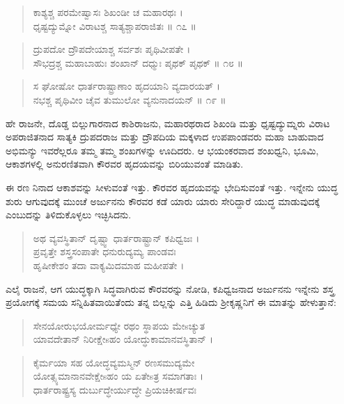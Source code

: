 \begin{verse}
ಕಾಶ್ಯಶ್ಚ ಪರಮೇಷ್ವಾಸಃ ಶಿಖಂಡೀ ಚ ಮಹಾರಥಃ ।\\ಧೃಷ್ಟದ್ಯುಮ್ನೋ ವಿರಾಟಶ್ಚ ಸಾತ್ಯಶ್ಚಾಪರಾಜಿತಃ \num{॥ ೧೭ ॥}
\end{verse}

\begin{verse}
ದ್ರುಪದೋ ದ್ರೌಪದೇಯಾಶ್ಚ ಸರ್ವಶಃ ಪೃಥಿವೀಪತೇ ।\\ಸೌಭದ್ರಶ್ಚ ಮಹಾಬಾಹುಃ ಶಂಖಾನ್ ದಧ್ಮುಃ ಪೃಥಕ್ ಪೃಥಕ್ \num{॥ ೧೮ ॥}
\end{verse}

\begin{verse}
ಸ ಘೋಷೋ ಧಾರ್ತರಾಷ್ಟ್ರಾಣಾಂ ಹೃದಯಾನಿ ವ್ಯದಾರಯತ್ ।\\ನಭಶ್ಚ ಪೃಥಿವೀಂ ಚೈವ ತುಮುಲೋ ವ್ಯನುನಾದಯನ್ \num{॥ ೧೯ ॥}
\end{verse}

{\small ಹೇ ರಾಜನೇ, ದೊಡ್ಡ ಬಿಲ್ಲುಗಾರನಾದ ಕಾಶಿರಾಜನು, ಮಹಾರಥರಾದ ಶಿಖಂಡಿ ಮತ್ತು ಧೃಷ್ಟದ್ಯುಮ್ನರು ವಿರಾಟ ಅಪರಾಜಿತನಾದ ಸಾತ್ಯಕಿ ದ್ರುಪದರಾಜ ಮತ್ತು ದ್ರೌಪದಿಯ ಮಕ್ಕಳಾದ ಉಪಪಾಂಡವರು ಮಹಾ ಬಾಹುವಾದ ಅಭಿಮನ್ಯು ಇವರೆಲ್ಲರೂ ತಮ್ಮ ತಮ್ಮ ಶಂಖಗಳನ್ನು ಊದಿದರು. ಆ ಭಯಂಕರವಾದ ಶಂಖಧ್ವನಿ, ಭೂಮಿ, ಆಕಾಶಗಳಲ್ಲಿ ಅನುರಣಿತವಾಗಿ ಕೌರವರ ಹೃದಯವನ್ನು ಬಿರಿಯುವಂತೆ ಮಾಡಿತು.}

ಈ ರಣ ನಿನಾದ ಆಕಾಶವನ್ನು ಸೀಳುವಂತೆ ಇತ್ತು. ಕೌರವರ ಹೃದಯವನ್ನು ಭೇದಿಸುವಂತೆ ಇತ್ತು. ಇನ್ನೇನು ಯುದ್ಧ ಶುರು ಆಗುವುದಕ್ಕೆ ಮುಂಚೆ ಅರ್ಜುನನು ಕೌರವರ ಕಡೆ ಯಾರು ಯಾರು ಸೇರಿದ್ದಾರೆ ಯುದ್ಧ ಮಾಡುವುದಕ್ಕೆ ಎಂಬುದನ್ನು ತಿಳಿದುಕೊಳ್ಳಲು ಇಚ್ಛಿಸಿದನು.

\begin{verse}
ಅಥ ವ್ಯವಸ್ಥಿತಾನ್ ದೃಷ್ಟ್ವಾ ಧಾರ್ತರಾಷ್ಟ್ರಾನ್ ಕಪಿಧ್ವಜಃ ।\\ಪ್ರವೃತ್ತೇ ಶಸ್ತ್ರಸಂಪಾತೇ ಧನುರುದ್ಯಮ್ಯ ಪಾಂಡವಃ \\ಹೃಷೀಕೇಶಂ ತದಾ ವಾಕ್ಯಮಿದಮಾಹ ಮಹೀಪತೇ ।
\end{verse}

{\small ಎಲೈ ರಾಜನೆ, ಆಗ ಯುದ್ಧಕ್ಕಾಗಿ ಸಿದ್ಧವಾಗಿರುವ ಕೌರವರನ್ನು ನೋಡಿ, ಕಪಿಧ್ವಜನಾದ ಅರ್ಜುನನು ಇನ್ನೇನು ಶಸ್ತ್ರ ಪ್ರಯೋಗಕ್ಕೆ ಸಮಯ ಸನ್ನಿಹಿತವಾಯಿತೆಂದು ತನ್ನ ಬಿಲ್ಲನ್ನು ಎತ್ತಿ ಹಿಡಿದು ಶ್ರೀಕೃಷ್ಣನಿಗೆ ಈ ಮಾತನ್ನು ಹೇಳುತ್ತಾನೆ:}

\begin{verse}
ಸೇನಯೋರುಭಯೋರ್ಮಧ್ಯೇ ರಥಂ ಸ್ಥಾಪಯ ಮೇsಚ್ಯುತ \\ಯಾವದೇತಾನ್ ನಿರೀಕ್ಷೇsಹಂ ಯೋದ್ಧುಕಾಮಾನವಸ್ಥಿತಾನ್ ।
\end{verse}

\begin{verse}
ಕೈರ್ಮಯಾ ಸಹ ಯೋದ್ಧವ್ಯಮಸ್ಮಿನ್ ರಣಸಮುದ್ಯಮೇ \\ಯೋತ್ಸ್ಯಮಾನಾನವೇಕ್ಷೇsಹಂ ಯ ಏತೇsತ್ರ ಸಮಾಗತಾಃ ।\\ಧಾರ್ತರಾಷ್ಟ್ರಸ್ಯ ದುರ್ಬುದ್ಧೇರ್ಯುದ್ಧೇ ಪ್ರಿಯಚಿಕೀರ್ಷವಃ 
\end{verse}


